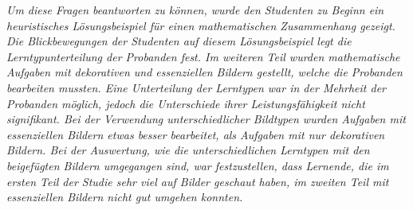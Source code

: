 \textit{Um diese Fragen beantworten zu können, wurde den Studenten zu Beginn ein heuristisches Lösungsbeispiel für einen mathematischen Zusammenhang gezeigt. Die Blickbewegungen der Studenten auf diesem Lösungsbeispiel legt die Lerntypunterteilung der Probanden fest. Im weiteren Teil wurden mathematische Aufgaben mit dekorativen und essenziellen Bildern gestellt, welche die Probanden bearbeiten mussten. Eine Unterteilung der Lerntypen war in der Mehrheit der Probanden möglich, jedoch die Unterschiede ihrer Leistungsfähigkeit nicht signifikant. Bei der Verwendung unterschiedlicher Bildtypen wurden Aufgaben mit essenziellen Bildern etwas besser bearbeitet, als Aufgaben mit nur dekorativen Bildern. Bei der Auswertung, wie die unterschiedlichen Lerntypen mit den beigefügten Bildern umgegangen sind, war festzustellen, dass Lernende, die im ersten Teil der Studie sehr viel auf Bilder geschaut haben, im zweiten Teil mit essenziellen Bildern nicht gut umgehen konnten.}


\tableofcontents %










\printbibliography
\clearpage

\listoffigures %

\printacronyms[title={Abkürzungsverzeichnis}] %

\listoftables %

\onehalfspacing

